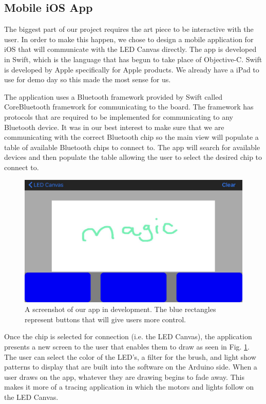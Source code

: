 \documentclass[11pt]{IEEEtran}
\begin{document}
\subsection{Mobile iOS App}
The biggest part of our project requires the art piece to be interactive with the user. In order to make this happen, we chose to design a mobile application for iOS that will communicate with the LED Canvas directly. The app is developed in Swift, which is the language that has begun to take place of Objective-C. Swift is developed by Apple specifically for Apple products. We already have a iPad to use for demo day so this made the most sense for us.

The application uses a Bluetooth framework provided by Swift called CoreBluetooth framework for communicating to the board. The framework has protocols that are required to be implemented for communicating to any Bluetooth device. It was in our best interest to make sure that we are communicating with the correct Bluetooth chip so the main view will populate a table of available Bluetooth chips to connect to. The app will search for available devices and then populate the table allowing the user to select the desired chip to connect to.

\begin{figure}[H]
  \centering
  \includegraphics[width=\columnwidth]{image3.png}
  \caption{A screenshot of our app in development. The blue rectangles represent buttons that will give users more control.}
  \label{fig:iosapp}
\end{figure}

Once the chip is selected for connection (i.e. the LED Canvas), the application presents a new screen to the user that enables them to draw as seen in Fig. \ref{fig:iosapp}. The user can select the color of the LED’s, a filter for the brush, and light show patterns to display that are built into the software on the Arduino side. When a user draws on the app, whatever they are drawing begins to fade away. This makes it more of a tracing application in which the motors and lights follow on the LED Canvas.
\end{document}
